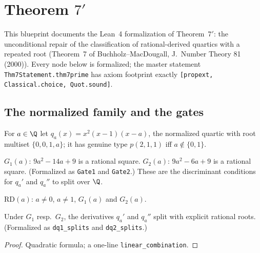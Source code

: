 \chapter{Theorem $7'$}

This blueprint documents the Lean~4 formalization of Theorem~$7'$: the
unconditional repair of the classification of rational-derived quartics
with a repeated root (Theorem~7 of Buchholz--MacDougall,
J.~Number Theory 81 (2000)).  Every node below is formalized; the master
statement \texttt{Thm7Statement.thm7prime} has axiom footprint exactly
\texttt{[propext, Classical.choice, Quot.sound]}.

\section{The normalized family and the gates}

\begin{definition}\label{def:family}
\leanok
For $a \in \Q$ let $q_a(x) = x^2(x-1)(x-a)$, the normalized quartic with
root multiset $\{0,0,1,a\}$; it has genuine type $p(2,1,1)$ iff
$a \notin \{0,1\}$.
\end{definition}

\begin{definition}[Gates]\label{def:gates}
\leanok
{}
$G_1(a)$: $9a^2-14a+9$ is a rational square.
$G_2(a)$: $9a^2-6a+9$ is a rational square.
(Formalized as \texttt{Gate1} and \texttt{Gate2}.)  These are the
discriminant conditions for $q_a'$ and $q_a''$ to split over $\Q$.
\end{definition}

\begin{definition}\label{def:rd}
\leanok
{}
$\mathrm{RD}(a)$: $a \neq 0$, $a \neq 1$, $G_1(a)$ and $G_2(a)$.
\end{definition}

\begin{lemma}\label{lem:splits}
\leanok
{}
Under $G_1$ resp.\ $G_2$, the derivatives $q_a'$ and $q_a''$ split with
explicit rational roots.  (Formalized as \texttt{dq1\_splits} and
\texttt{dq2\_splits}.)
\end{lemma}
\begin{proof}\leanok
Quadratic formula; a one-line \texttt{linear\_combination}.
\end{proof}

